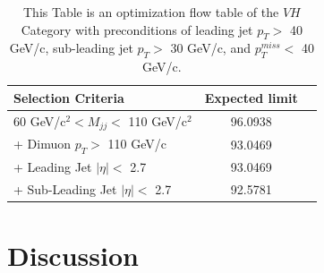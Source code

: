\documentclass[12pt]{article}
\begin{document}
\begin{table}[!hbtp]
  \begin{center}
    \caption{ \label{tab:ExpectedLimits}
        This Table is an optimization flow table of the $VH$ Category with preconditions of leading jet $p_{T} >$ 40
	GeV/c, sub-leading jet $p_{T} >$ 30 GeV/c, and $p_{T}^{miss} <$ 40 GeV/c.
    }
    \begin{tabular}{lcc} \hline \hline
         Selection Criteria & Expected limit \\ \hline
         60 GeV/c$^{2} < M_{jj} <$ 110 GeV/c$^{2}$ & 96.0938  \\
         + Dimuon $p_{T} >$ 110 GeV/c & 93.0469 \\
	 + Leading Jet $|\eta| <$ 2.7 & 93.0469 \\
	 + Sub-Leading Jet $|\eta| <$ 2.7 & 92.5781 \\
     \hline \hline
    \end{tabular}
  \end{center}
\end{table}

\section{Discussion}
\end{document}
